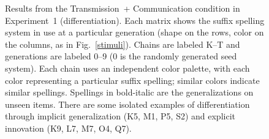 \documentclass[doc,biblatex]{apa7}
\begin{document}
	\begin{figure}
	\vspace*{2pt}
	\caption{Results from the Transmission~+ Communication condition in Experiment~1 (differentiation). Each matrix shows the suffix spelling system in use at a particular generation (shape on the rows, color on the columns, as in Fig.~\ref{stimuli}). Chains are labeled K--T and generations are labeled 0–9 (0 is the randomly generated seed system). Each chain uses an independent color palette, with each color representing a particular suffix spelling; similar colors indicate similar spellings. Spellings in bold-italic are the generalizations on unseen items. There are some isolated examples of differentiation through implicit generalization (K5, M1, P5, S2) and explicit innovation (K9, L7, M7, O4, Q7).}
	\label{dif_com}
	\end{figure}
\end{document}
